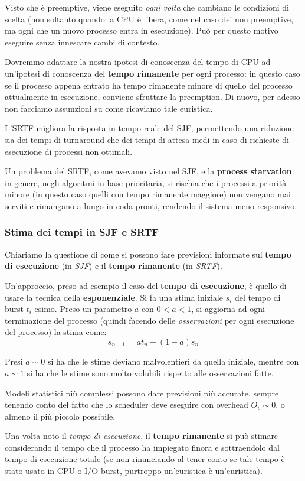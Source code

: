 \documentclass[a4paper,11pt]{article}
\begin{document}
Visto che è preemptive, viene eseguito \textit{ogni volta} che cambiano le condizioni di scelta (non soltanto quando la CPU è libera, come nel caso dei non preemptive, ma ogni che un nuovo processo entra in esecuzione).
Può per questo motivo eseguire senza innescare cambi di contesto.

Dovremmo adattare la nostra ipotesi di conoscenza del tempo di CPU ad un'ipotesi di conoscenza del \textbf{tempo rimanente} per ogni processo: in questo caso se il processo appena entrato ha tempo rimanente minore di quello del processo attualmente in esecuzione, conviene sfruttare la preemption.
Di nuovo, per adesso non facciamo assunzioni su come ricaviamo tale euristica.

L'SRTF migliora la risposta in tempo reale del SJF, permettendo una riduzione sia dei tempi di turnaround che dei tempi di attesa medi in caso di richieste di esecuzione di processi non ottimali. 

Un problema del SRTF, come avevamo visto nel SJF, e la \textbf{process starvation}: in genere, negli algoritmi in base prioritaria, si rischia che i processi a priorità minore (in questo caso quelli con tempo rimanente maggiore) non vengano mai serviti e rimangano a lungo in coda pronti, rendendo il sistema meno responsivo.

\subsubsection{Stima dei tempi in SJF e SRTF}
Chiariamo la questione di come si possono fare previsioni informate sul \textbf{tempo di esecuzione} (in \textit{SJF}) e il \textbf{tempo rimanente} (in \textit{SRTF}).

Un'approccio, preso ad esempio il caso del \textbf{tempo di esecuzione}, è quello di usare la tecnica della \textbf{esponenziale}.
Si fa una stima iniziale $s_i$ del tempo di burst $t_i$ esimo.
Preso un parametro $a$ con $0 < a < 1$, si aggiorna ad ogni terminazione del processo (quindi facendo delle \textit{osservazioni} per ogni esecuzione del processo) la stima come:
$$
s_{n + 1} = a t_n + (1 - a) s_n
$$

Presi $a \sim 0$ si ha che le stime deviano malvolentieri da quella iniziale, mentre con $a \sim 1$ si ha che le stime sono molto volubili rispetto alle osservazioni fatte. 

Modeli statistici più complessi possono dare previsioni più accurate, sempre tenendo conto del fatto che lo scheduler deve eseguire con overhead $O_v \sim 0$, o almeno il più piccolo possibile.

Una volta noto il \textit{tempo di esecuzione}, il \textbf{tempo rimanente} si può stimare considerando il tempo che il processo ha impiegato finora e sottraendolo dal tempo di esecuzione totale (se non rinunciando al tener conto se tale tempo è stato usato in CPU o I/O burst, purtroppo un'euristica è un'euristica).
\end{document}
